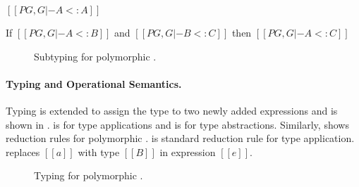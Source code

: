 \begin{lemma}
  $[[PG , G |- A <: A]]$
\label{lemma:union:poly:sub:refl}
\end{lemma}

\begin{lemma}
  If $[[PG , G |- A <: B]]$ and $[[PG , G |- B <: C]]$ then $[[PG , G |- A <: C]]$
\label{lemma:union:poly:sub:trans}
\end{lemma}


\begin{figure}[t]
  \begin{small}
    \centering
  \end{small}
  \caption{Subtyping for polymorphic \name.}
  \label{fig:union:poly:sub}
\end{figure}


\paragraph*{Typing and Operational Semantics.}
Typing is extended to
assign the type to two newly added expressions and is 
shown in .  is
for type applications and  is for type abstractions.
Similarly,  shows reduction rules for polymorphic \name.
 is standard reduction rule for type application.
 replaces $[[a]]$ with type $[[B]]$ in expression $[[e]]$.



\begin{figure}[t]
  \begin{small}
    \centering
  \end{small}
  \caption{Typing for polymorphic \name.}
  \label{fig:union:poly:typ}
\end{figure}





